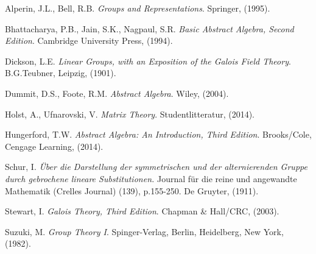 \documentclass[a4paper , 11pt]{book}
\theoremstyle{definition}
\theoremstyle{remark}
\begin{document}
\begin{thebibliography}{9}

Alperin, J.L., Bell, R.B. 
\textit{Groups and Representations}. 
Springer,
(1995).

Bhattacharya, P.B., Jain, S.K., Nagpaul, S.R. 
\textit{Basic Abstract Algebra, Second Edition}. 
Cambridge University Press,
(1994).

Dickson, L.E. 
\textit{Linear Groups, with an Exposition of the Galois Field Theory}. 
B.G.Teubner, Leipzig,
(1901).

Dummit, D.S., Foote, R.M. 
\textit{Abstract Algebra}. 
Wiley,
(2004).

Holst, A., Ufnarovski, V. 
\textit{Matrix Theory}. 
Studentlitteratur,
(2014).

Hungerford, T.W. 
\textit{Abstract Algebra: An Introduction, Third Edition}. 
Brooks/Cole, Cengage Learning,
(2014).

Schur, I. 
\textit{Über die Darstellung der symmetrischen und der alternierenden Gruppe durch gebrochene lineare Substitutionen.} Journal für die reine und angewandte Mathematik (Crelles Journal) (139), p.155-250. 
De Gruyter,
(1911).

Stewart, I. 
\textit{Galois Theory, Third Edition}. 
Chapman \& Hall/CRC,
(2003).

Suzuki, M. 
\textit{Group Theory I}. 
Spinger-Verlag, Berlin, Heidelberg, New York, 
(1982).

\end{thebibliography}
\end{document}
